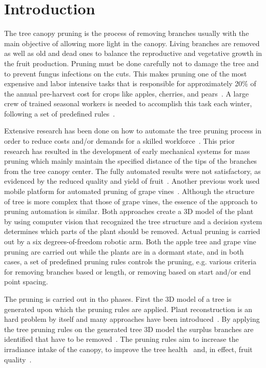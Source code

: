 \section{Introduction}
The tree canopy pruning is the process of removing branches usually with the main
objective of allowing more light in the canopy. Living branches are
removed as well as old and dead ones to balance the reproductive and
vegetative growth in the fruit production. Pruning must be done carefully not to damage the tree and to prevent fungus infections on the cuts. This makes pruning one of the most expensive and labor intensive tasks that is responsible for approximately 20\% of the annual pre-harvest cost for crops like apples, cherries, and pears~\cite{karkee_identification_2014}. A large crew of trained seasonal workers is needed to accomplish this task each winter, following a set of predefined rules~\cite{akbar_novel_2016}. 

Extensive research has been done on how to automate the tree pruning process in order to reduce costs and/or demands for a skilled workforce~\cite{jensen_effects_1980,karkee_identification_2014,moore_mechanical_1958}. This prior research has resulted in the development of early mechanical systems for mass pruning which mainly maintain the specified distance of the tips of the branches from the tree canopy center. The
fully automated results were not satisfactory, as evidenced by the reduced quality and
yield of fruit~\cite{karkee_identification_2014}. 
Another previous work used mobile platform for automated pruning of grape vines~\cite{botterill_robot_2017}. 
Although the structure of tree is more complex that those of
grape vines, the essence of the approach to pruning automation is
similar. Both approaches create a 3D model of the plant by using computer vision
that recognized the tree structure and a decision system determines which
parts of the plant should be removed. Actual pruning is carried out by a six degrees-of-freedom
robotic arm. Both the apple tree and grape vine pruning are carried out while
the plants are in a dormant state, and in both cases, a set of
predefined pruning rules controls the pruning, e.g. various criteria for removing branches based or length, or removing based on start and/or end point spacing.

The pruning is carried out in tho phases. First the 3D model of a tree is generated upon which the pruning rules are applied. Plant reconstruction is an hard problem by itself
and many approaches have been introduced~\cite{livny_automatic_2010,xie_tree_2016,zhang_data-driven_2014}. 
By applying the tree pruning rules on the generated tree 3D model the
surplus branches are identified that have to be removed~\cite{akbar_novel_2016,elfiky_automation_2015,medeiros_modeling_2017}.
The pruning rules aim to increase the irradiance intake of the canopy,  to improve the tree health~\cite{simon_does_2006} and, in effect, fruit quality~\cite{bastias_light_2012}. 


